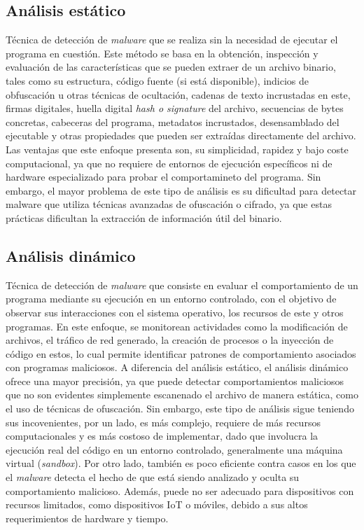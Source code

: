 \subsection{Análisis estático}
Técnica de detección de \textit{malware} que se realiza sin la necesidad de ejecutar el programa en cuestión. Este método se basa en la obtención, inspección y evaluación de las características que se pueden extraer de un archivo binario, tales como su estructura, código fuente (si está disponible), indicios de obfuscación u otras técnicas de ocultación, cadenas de texto incrustadas en este, firmas digitales, huella digital \textit{hash o signature} del archivo, secuencias de bytes concretas, cabeceras del programa, metadatos incrustados, desensamblado del ejecutable y otras propiedades que pueden ser extraídas directamente del archivo. Las ventajas que este enfoque presenta son, su simplicidad, rapidez y bajo coste computacional, ya que no requiere de entornos de ejecución específicos ni de hardware especializado para probar el comportamineto del programa. Sin embargo, el mayor problema de este tipo de análisis es su dificultad para detectar malware que utiliza técnicas avanzadas de ofuscación o cifrado, ya que estas prácticas dificultan la extracción de información útil del binario.

\subsection{Análisis dinámico}
Técnica de detección de \textit{malware} que consiste en evaluar el comportamiento de un programa mediante su ejecución en un entorno controlado, con el objetivo de observar sus interacciones con el sistema operativo, los recursos de este y otros programas. En este enfoque, se monitorean actividades como la modificación de archivos, el tráfico de red generado, la creación de procesos o la inyección de código en estos, lo cual permite identificar patrones de comportamiento asociados con programas maliciosos. A diferencia del análisis estático, el análisis dinámico ofrece una mayor precisión, ya que puede detectar comportamientos maliciosos que no son evidentes simplemente escanenado el archivo de manera estática, como el uso de técnicas de ofuscación. Sin embargo, este tipo de análisis sigue teniendo sus incovenientes, por un lado, es más complejo, requiere de más recursos computacionales y es más costoso de implementar, dado que involucra la ejecución real del código en un entorno controlado, generalmente una máquina virtual (\textit{sandbox}). Por otro lado, también es poco eficiente contra casos en los que el \textit{malware} detecta el hecho de que está siendo analizado y oculta su comportamiento malicioso. Además, puede no ser adecuado para dispositivos con recursos limitados, como dispositivos IoT o móviles, debido a sus altos requerimientos de hardware y tiempo.

